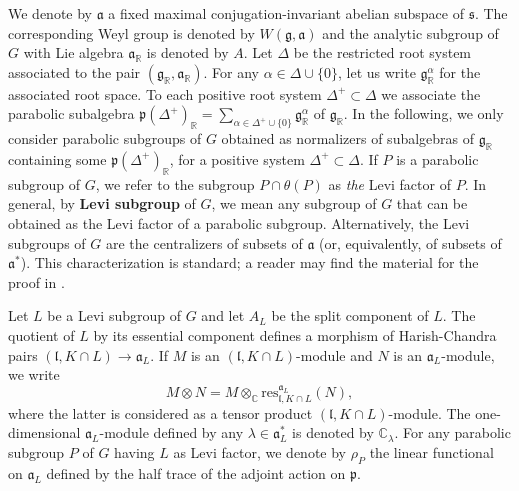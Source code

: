 \documentclass{amsart}
\theoremstyle{definition}
\begin{document}
We denote by $\mathfrak{a}$ a fixed maximal conjugation-invariant abelian subspace of $\mathfrak{s}$. The corresponding Weyl group is denoted by $W(\mathfrak{g},\mathfrak{a})$ and the analytic subgroup of $G$ with Lie algebra $\mathfrak{a}_\mathbb{R}$ is denoted by $A$. Let $\Delta$ be the restricted root system associated to the pair $(\mathfrak{g}_\mathbb{R},\mathfrak{a}_\mathbb{R})$. For any $\alpha \in \Delta\cup\{0\}$, let us write $\mathfrak{g}_\mathbb{R}^\alpha$ for the associated root space. To each positive root system $\Delta^+ \subset \Delta$ we associate the parabolic subalgebra $\mathfrak{p}(\Delta^+)_\mathbb{R} = \sum_{\alpha \in \Delta^+\cup \{0\}} \mathfrak{g}_\mathbb{R}^\alpha$ of $\mathfrak{g}_\mathbb{R}$. In the following, we only consider parabolic subgroups of $G$ obtained as normalizers of subalgebras of $\mathfrak{g}_\mathbb{R}$ containing some $\mathfrak{p}(\Delta^+)_\mathbb{R}$, for a positive system $\Delta^+ \subset \Delta$. If $P$ is a parabolic subgroup of $G$, we refer to the subgroup $P \cap \theta(P)$ as \textit{the} Levi factor of $P$. In general, by \textbf{Levi subgroup} of $G$, we mean any subgroup of $G$ that can be obtained as the Levi factor of a parabolic subgroup. Alternatively, the Levi subgroups of $G$ are the centralizers of subsets of $\mathfrak{a}$ (or, equivalently, of subsets of $\mathfrak{a}^*$). This characterization is standard; a reader may find the material for the proof in \cite{Knapp}.

Let $L$ be a Levi subgroup of $G$ and let $A_L$ be the split component of $L$. The quotient of $L$ by its essential component defines a morphism of Harish-Chandra pairs $(\mathfrak{l}, K\cap L) \to \mathfrak{a}_L$. If $M$ is an $(\mathfrak{l}, K\cap L)$-module and $N$ is an $\mathfrak{a}_L$-module, we write
\begin{equation}\label{tensor_prod_module_1} M \otimes N = M \otimes_\mathbb{C} \mathrm{res}_{\mathfrak{l}, K\cap L}^{\mathfrak{a}_L}(N),\end{equation}
where the latter is considered as a tensor product $(\mathfrak{l}, K\cap L)$-module. The one-dimensional $\mathfrak{a}_L$-module defined by any $\lambda \in \mathfrak{a}_L^*$ is denoted by $\mathbb{C}_\lambda$. For any parabolic subgroup $P$ of $G$ having $L$ as Levi factor, we denote by $\rho_P$ the linear functional on $\mathfrak{a}_L$ defined by the half trace of the adjoint action on $\mathfrak{p}$.
\end{document}
